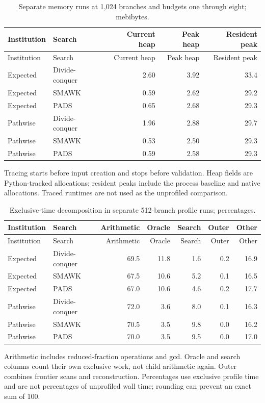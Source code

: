 \begin{longtable}{@{}llrrr@{}}
\caption{Separate memory runs at 1,024 branches and budgets one through eight; mebibytes.}\label{tab:r37-memory}\\
\toprule
Institution & Search & Current heap & Peak heap & Resident peak \\
\midrule
\endfirsthead
\toprule
Institution & Search & Current heap & Peak heap & Resident peak \\
\midrule
\endhead
\bottomrule
\endfoot
Expected & Divide-conquer & 2.60 & 3.92 & 33.4 \\
Expected & SMAWK & 0.59 & 2.62 & 29.2 \\
Expected & PADS & 0.65 & 2.68 & 29.3 \\
Pathwise & Divide-conquer & 1.96 & 2.88 & 29.7 \\
Pathwise & SMAWK & 0.53 & 2.50 & 29.3 \\
Pathwise & PADS & 0.59 & 2.58 & 29.3 \\
\end{longtable}
\noindent Tracing starts before input creation and stops before validation. Heap fields are Python-tracked allocations; resident peaks include the process baseline and native allocations. Traced runtimes are not used as the unprofiled comparison.


\clearpage
\begin{longtable}{@{}llrrrrr@{}}
\caption{Exclusive-time decomposition in separate 512-branch profile runs; percentages.}\label{tab:r37-profile}\\
\toprule
Institution & Search & Arithmetic & Oracle & Search & Outer & Other \\
\midrule
\endfirsthead
\toprule
Institution & Search & Arithmetic & Oracle & Search & Outer & Other \\
\midrule
\endhead
\bottomrule
\endfoot
Expected & Divide-conquer & 69.5 & 11.8 & 1.6 & 0.2 & 16.9 \\
Expected & SMAWK & 67.5 & 10.6 & 5.2 & 0.1 & 16.5 \\
Expected & PADS & 67.0 & 10.6 & 4.6 & 0.2 & 17.7 \\
Pathwise & Divide-conquer & 72.0 & 3.6 & 8.0 & 0.1 & 16.3 \\
Pathwise & SMAWK & 70.5 & 3.5 & 9.8 & 0.0 & 16.2 \\
Pathwise & PADS & 70.0 & 3.5 & 9.5 & 0.0 & 17.0 \\
\end{longtable}
\noindent Arithmetic includes reduced-fraction operations and gcd. Oracle and search columns count their own exclusive work, not child arithmetic again. Outer combines frontier scans and reconstruction. Percentages use exclusive profile time and are not percentages of unprofiled wall time; rounding can prevent an exact sum of 100.

